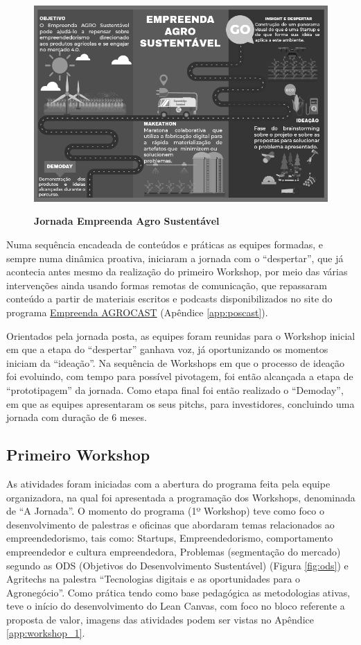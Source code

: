 \begin{figure}[H]
\centering
\caption{\textbf{Jornada Empreenda Agro Sustentável}}
\includegraphics[scale=0.5]{Imagens/jornada.png}
\label{figura_17}
\end{figure}


Numa sequência encadeada de conteúdos e práticas as equipes formadas, e sempre numa dinâmica proativa, iniciaram a jornada com o “despertar”, que já acontecia antes mesmo da realização do primeiro Workshop, por meio das várias intervenções ainda usando formas remotas de comunicação, que repassaram conteúdo a partir de materiais escritos e  podcasts disponibilizados no site do programa \href{https://open.spotify.com/show/3c25hRSxvaCFPw6Y3lX3i1?si=9H_fGz_uRgGiFNhAcdr4rQ}{Empreenda AGROCAST} (Apêndice \ref{app:poscast}). 

Orientados pela jornada posta, as equipes foram reunidas para o Workshop inicial em que a etapa do “despertar” ganhava voz, já oportunizando os momentos iniciam da “ideação”. Na sequência de Workshops em que o processo de ideação foi evoluindo, com tempo para possível pivotagem, foi então alcançada a etapa de “prototipagem” da jornada. Como etapa final foi então realizado o “Demoday”, em que as equipes apresentaram os seus pitchs, para investidores, concluindo uma jornada com duração de 6 meses.

\subsection{Primeiro Workshop}

As atividades foram iniciadas com a abertura do programa feita pela equipe organizadora, na qual foi apresentada a programação dos Workshops, denominada de “A Jornada”. O momento do programa (1º Workshop) teve como foco o desenvolvimento de palestras e oficinas que abordaram temas relacionados ao empreendedorismo, tais como: Startups, Empreendedorismo, comportamento empreendedor e cultura empreendedora, Problemas (segmentação do mercado) segundo as ODS (Objetivos do Desenvolvimento Sustentável) (Figura \ref{fig:ods}) e Agritechs na palestra “Tecnologias digitais e as oportunidades para o Agronegócio”. Como prática tendo como base pedagógica as metodologias ativas, teve o início do desenvolvimento do Lean Canvas, com foco no bloco referente a proposta de valor, imagens das atividades podem ser vistas no Apêndice \ref{app:workshop_1}.

